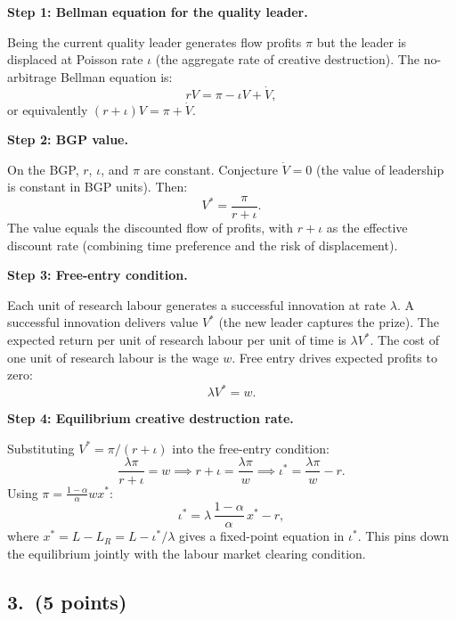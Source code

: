 \documentclass[a4paper,11pt]{article}
\begin{document}
\begin{answerbox}
\textbf{Step 1: Bellman equation for the quality leader.}

Being the current quality leader generates flow profits $\pi$ but the leader is displaced
at Poisson rate $\iota$ (the aggregate rate of creative destruction). The no-arbitrage
Bellman equation is:
\[
    r V = \pi - \iota V + \dot{V},
\]
or equivalently $(r + \iota)V = \pi + \dot{V}$.

\textbf{Step 2: BGP value.}

On the BGP, $r$, $\iota$, and $\pi$ are constant. Conjecture $\dot{V} = 0$ (the value of
leadership is constant in BGP units). Then:
\[
    \boxed{V^* = \frac{\pi}{r + \iota}.}
\]
The value equals the discounted flow of profits, with $r + \iota$ as the effective
discount rate (combining time preference and the risk of displacement).

\textbf{Step 3: Free-entry condition.}

Each unit of research labour generates a successful innovation at rate $\lambda$. A
successful innovation delivers value $V^*$ (the new leader captures the prize). The
expected return per unit of research labour per unit of time is $\lambda V^*$. The cost
of one unit of research labour is the wage $w$. Free entry drives expected profits to zero:
\[
    \lambda V^* = w.
\]

\textbf{Step 4: Equilibrium creative destruction rate.}

Substituting $V^* = \pi/(r+\iota)$ into the free-entry condition:
\[
    \frac{\lambda \pi}{r + \iota} = w
    \implies r + \iota = \frac{\lambda\pi}{w}
    \implies \iota^* = \frac{\lambda\pi}{w} - r.
\]
Using $\pi = \frac{1-\alpha}{\alpha}w x^*$:
\[
    \boxed{\iota^* = \lambda\,\frac{1-\alpha}{\alpha}\,x^* - r,}
\]
where $x^* = L - L_R = L - \iota^*/\lambda$ gives a fixed-point equation in $\iota^*$.
This pins down the equilibrium jointly with the labour market clearing condition.
\end{answerbox}

\subsection*{3.\ (5 points)}
\end{document}
